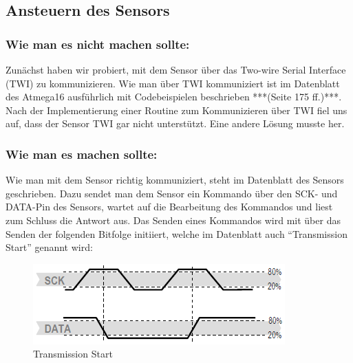 \documentclass[]{article}
\begin{document}
\subsection{Ansteuern des Sensors}
\subsubsection{Wie man es nicht machen sollte:}
Zunächst haben wir probiert, mit dem Sensor über das Two-wire Serial Interface (TWI) zu kommunizieren. Wie man über TWI kommuniziert ist im Datenblatt des Atmega16 ausführlich mit Codebeispielen beschrieben ***(Seite 175 ff.)***. Nach der Implementierung einer Routine zum Kommunizieren über TWI fiel uns auf, dass der Sensor TWI gar nicht unterstützt. Eine andere Lösung musste her.
\subsubsection{Wie man es machen sollte:}
Wie man mit dem Sensor richtig kommuniziert, steht im Datenblatt des Sensors geschrieben. Dazu sendet man dem Sensor ein Kommando über den SCK- und DATA-Pin des Sensors, wartet auf die Bearbeitung des Kommandos und liest zum Schluss die Antwort aus. 
Das Senden eines Kommandos wird mit über das Senden der folgenden Bitfolge initiiert, welche im Datenblatt auch "`Transmission Start"' genannt wird: 
\begin{figure}[h]
	\centering
	\includegraphics[width=0.5\columnwidth]{transmission_start.png}
	\caption{Transmission Start}
\end{figure}
\end{document}
